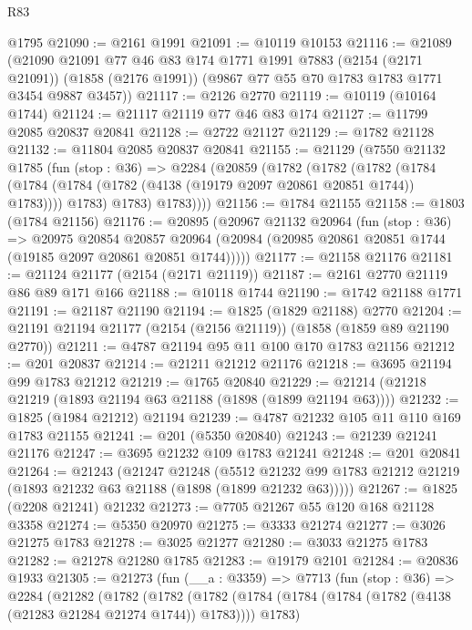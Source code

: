 \begin{lexlean}{R83}
\begin{coremodule}
    @1795
@21090 := @2161 @1991
@21091 := @10119 @10153
@21116 := @21089
    (@21090
      @21091
      @77
      @46
      @83
      @174
      @1771
      @1991
      @7883
      (@2154 (@2171 @21091))
      (@1858 (@2176 @1991))
      (@9867 @77 @55 @70 @1783 @1783 @1771 @3454 @9887 @3457))
@21117 := @2126 @2770
@21119 := @10119 (@10164 @1744)
@21124 := @21117 @21119 @77 @46 @83 @174
@21127 := @11799 @2085 @20837 @20841
@21128 := @2722 @21127
@21129 := @1782 @21128
@21132 := @11804 @2085 @20837 @20841
@21155 := @21129
    (@7550
      @21132
      @1785
      (fun (stop : @36) =>
      @2284
        (@20859
          (@1782
            (@1782
              (@1782
                (@1784 (@1784 (@1784 (@1782 (@4138 (@19179 @2097 @20861 @20851 @1744)) @1783))))
                @1783)
              @1783)
            @1783))))
@21156 := @1784 @21155
@21158 := @1803 (@1784 @21156)
@21176 := @20895
    (@20967
      @21132
      @20964
      (fun (stop : @36) =>
      @20975
        @20854
        @20857
        @20964
        (@20984 (@20985 @20861 @20851 @1744 (@19185 @2097 @20861 @20851 @1744)))))
@21177 := @21158 @21176
@21181 := @21124 @21177 (@2154 (@2171 @21119))
@21187 := @2161 @2770 @21119 @86 @89 @171 @166
@21188 := @10118 @1744
@21190 := @1742 @21188 @1771
@21191 := @21187 @21190
@21194 := @1825 (@1829 @21188) @2770
@21204 := @21191 @21194 @21177 (@2154 (@2156 @21119)) (@1858 (@1859 @89 @21190 @2770))
@21211 := @4787 @21194 @95 @11 @100 @170 @1783 @21156
@21212 := @201 @20837
@21214 := @21211 @21212 @21176
@21218 := @3695 @21194 @99 @1783 @21212
@21219 := @1765 @20840
@21229 := @21214 (@21218 @21219 (@1893 @21194 @63 @21188 (@1898 (@1899 @21194 @63))))
@21232 := @1825 (@1984 @21212) @21194
@21239 := @4787 @21232 @105 @11 @110 @169 @1783 @21155
@21241 := @201 (@5350 @20840)
@21243 := @21239 @21241 @21176
@21247 := @3695 @21232 @109 @1783 @21241
@21248 := @201 @20841
@21264 := @21243
    (@21247
      @21248
      (@5512 @21232 @99 @1783 @21212 @21219 (@1893 @21232 @63 @21188 (@1898 (@1899 @21232 @63)))))
@21267 := @1825 (@2208 @21241) @21232
@21273 := @7705 @21267 @55 @120 @168 @21128 @3358
@21274 := @5350 @20970
@21275 := @3333 @21274
@21277 := @3026 @21275 @1783
@21278 := @3025 @21277
@21280 := @3033 @21275 @1783
@21282 := @21278 @21280 @1785
@21283 := @19179 @2101
@21284 := @20836 @1933
@21305 := @21273
    (fun (__a : @3359) =>
    @7713
      (fun (stop : @36) =>
      @2284
        (@21282
          (@1782
            (@1782
              (@1782
                (@1784 (@1784 (@1784 (@1782 (@4138 (@21283 @21284 @21274 @1744)) @1783))))
                @1783)

\end{coremodule}
\end{lexlean}
